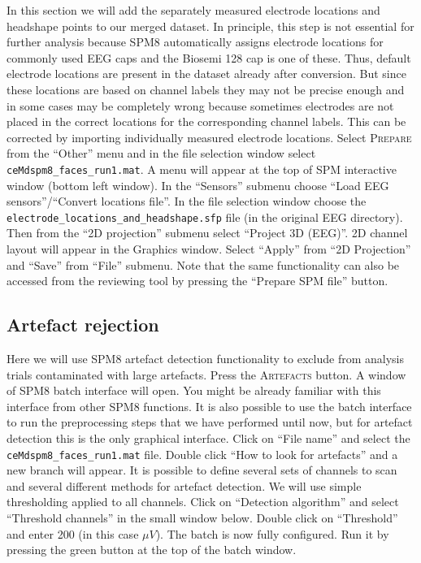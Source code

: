 In this section we will add the separately measured electrode locations and headshape points to our merged dataset. In principle, this step is not essential for further analysis because SPM8 automatically assigns electrode locations for commonly used EEG caps and the Biosemi 128 cap is one of these. Thus, default electrode locations are present in the dataset already after conversion. But since these locations are based on channel labels they may not be precise enough and in some cases may be completely wrong because sometimes electrodes are not placed in the correct locations for the corresponding channel labels. This can be corrected by importing individually measured electrode locations. Select \textsc{Prepare} from the ``Other'' menu and in the file selection window select \texttt{ceMdspm8\_faces\_run1.mat}. A menu will appear at the top of SPM interactive window (bottom left window). In the ``Sensors'' submenu choose ``Load EEG sensors''/``Convert locations file''. In the file selection window choose the \texttt{electrode\_locations\_and\_headshape.sfp} file (in the original EEG directory). Then from the ``2D projection'' submenu select ``Project 3D (EEG)''. 2D channel layout will appear in the Graphics window. Select ``Apply'' from ``2D Projection'' and ``Save'' from ``File'' submenu. Note that the same functionality can also be accessed from the reviewing tool by pressing the ``Prepare SPM file'' button.

\subsection{Artefact rejection}

Here we will use SPM8 artefact detection functionality to exclude from analysis trials contaminated with large artefacts. Press the \textsc{Artefacts} button. A window of SPM8 batch interface will open. You might be already familiar with this interface from other SPM8 functions. It is also possible to use the batch interface to run the preprocessing steps that we have performed until now, but for artefact detection this is the only graphical interface. Click on ``File name'' and select the \texttt{ceMdspm8\_faces\_run1.mat} file.  Double click ``How to look for artefacts'' and a new branch will appear. It is possible to define several sets of channels to scan and several different methods for artefact detection. We will use simple thresholding applied to all channels. Click on ``Detection algorithm'' and select ``Threshold channels'' in the small window below. Double click on ``Threshold'' and enter 200 (in this case $\mu V$). The batch is now fully configured. Run it by pressing the green button at the top of the batch window.

